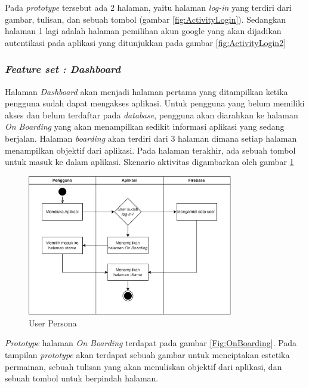 Pada \textit{prototype} tersebut ada 2 halaman, yaitu halaman \textit{log-in} yang terdiri dari gambar, tulisan, dan sebuah tombol (gambar \ref*{fig:ActivityLogin}).
Sedangkan halaman 1 lagi adalah halaman pemilihan akun google yang akan dijadikan autentikasi pada aplikasi yang ditunjukkan pada gambar \ref*{fig:ActivityLogin2}

\subsubsection{\textit{Feature set : Dashboard}}
Halaman \textit{Dashboard} akan menjadi halaman pertama yang ditampilkan ketika pengguna sudah dapat mengakses aplikasi.
Untuk pengguna yang belum memiliki akses dan belum terdaftar pada \textit{database}, pengguna akan diarahkan ke halaman \textit{On Boarding} yang akan menampilkan sedikit informasi aplikasi yang sedang berjalan.
Halaman \textit{boarding} akan terdiri dari 3 halaman dimana setiap halaman menampilkan objektif dari aplikasi.
Pada halaman terakhir, ada sebuah tombol untuk masuk ke dalam aplikasi. Skenario aktivitas digambarkan oleh gambar \ref*{Fig:ActivityMain}
\begin{figure}[H]
	\centering
	\includegraphics[width=0.8\textwidth]{contents/chapter-3/images/AD-halamanutama.png}
	\caption{User Persona}
	\label{Fig:ActivityMain}
\end{figure}
\textit{Prototype} halaman \textit{On Boarding} terdapat pada gambar \ref*{Fig:OnBoarding}. Pada tampilan \textit{prototype} akan terdapat sebuah gambar untuk menciptakan estetika permainan,
sebuah tulisan yang akan menuliskan objektif dari aplikasi, dan sebuah tombol untuk berpindah halaman.

